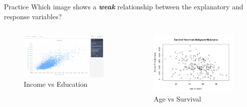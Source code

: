 \documentclass[
  ignorenonframetext,
]{beamer}
\begin{document}
\begin{frame}{Practice}
\label{practice}
Which image shows a \textbf{\emph{weak}} relationship between the
explanatory and response variables?

\begin{columns}[T]
\begin{column}{0.48\textwidth}
\begin{figure}[H]

{\centering \includegraphics{class31_files/mediabag/income-vs-college.png}

}

\caption{Income vs Education}

\end{figure}%
\end{column}

\begin{column}{0.48\textwidth}
\begin{figure}[H]

{\centering \includegraphics{class31_files/mediabag/age-vs-survival.png}

}

\caption{Age vs Survival}

\end{figure}%
\end{column}
\end{columns}
\end{frame}
\end{document}
